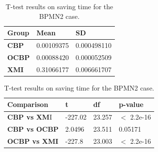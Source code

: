 \documentclass{llncs}
\begin{document}
\begin{table}[ht]
    \centering
    \label{table:ttest_save_time_bpmn2}
    \caption{T-test results on saving time for the BPMN2 case.}
    \begin{minipage}{0.44\textwidth}
        \centering
        \begin{tabular}{|p{}|p{}|p{}|}
            \hline 
            \textbf{Group}  & \textbf{Mean} & \textbf{SD} \\ 
            \hline 
            \textbf{CBP} &0.00109375    &0.000498110 \\ 
            \hline 
            \textbf{OCBP} &0.00088420   &0.000052509  \\ 
            \hline 
            \textbf{XMI} & 0.31066177   & 0.006661707 \\ 
            \hline 
        \end{tabular} 
    \end{minipage}
    \hfill
    \begin{minipage}{0.54\textwidth}
        \centering
        \begin{tabular}{|p{}|p{}|p{}|p{}|}
            \hline 
            \textbf{Comparison} & \textbf{t}  & \textbf{df} & \textbf{p-value} \\ 
            \hline 
            \textbf{CBP vs XM}I & -227.02    &23.257 & $<$ 2.2e-16 \\ 
            \hline 
            \textbf{CBP vs OCBP} & 2.0496 & 23.511  &0.05171 \\ 
            \hline 
            \textbf{OCBP vs XMI} & -227.8    & 23.003  & $<$ 2.2e-16 \\ 
            \hline 
        \end{tabular} 
    \end{minipage}
\end{table}
\end{document}
